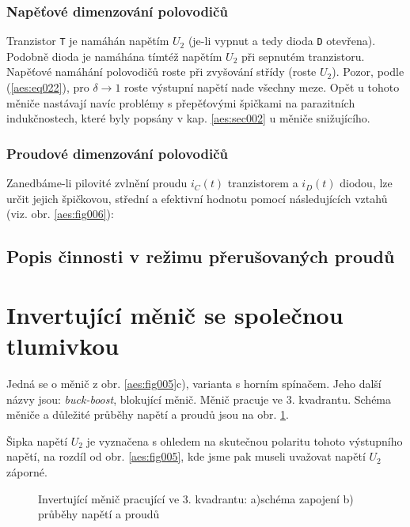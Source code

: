       \subsubsection{Napěťové dimenzování polovodičů}
        Tranzistor \texttt{T} je namáhán napětím \(U_2\) (je-li vypnut a tedy dioda \texttt{D} 
        otevřena). Podobně dioda je namáhána tímtéž napětím \(U_2\) při sepnutém tranzistoru. 
        Napěťové namáhání polovodičů roste při zvyšování střídy (roste \(U_2\)). Pozor, podle 
        (\ref{aes:eq022}), pro \(\delta\rightarrow1\) roste výstupní napětí nade všechny meze.
        Opět u tohoto měniče nastávají navíc problémy s přepěťovými špičkami na parazitních 
        indukčnostech, které byly popsány v kap. \ref{aes:sec002} u měniče snižujícího.
        
      \subsubsection{Proudové dimenzování polovodičů}
        Zanedbáme-li pilovité zvlnění proudu \(i_C(t)\) tranzistorem a \(i_D(t)\) diodou, lze určit 
        jejich špičkovou, střední a efektivní hodnotu pomocí následujících vztahů (viz. obr. 
        \ref{aes:fig006}):

    \subsection{Popis činnosti v režimu přerušovaných proudů}

  \section{Invertující měnič se společnou tlumivkou}\label{aes:sec003}  
    Jedná se o měnič z obr. \ref{aes:fig005}c), varianta s horním spínačem. Jeho další názvy jsou: 
    \emph{buck-boost}, blokující měnič. Měnič pracuje ve 3. kvadrantu. Schéma měniče a důležité 
    průběhy napětí a proudů jsou na obr. \ref{enz:fig_007}.
    
    Šipka napětí \(U_2\) je vyznačena s ohledem na skutečnou polaritu tohoto výstupního napětí, na 
    rozdíl od obr. \ref{aes:fig005}, kde jsme pak museli uvažovat napětí \(U_2\) záporné.
    
    \begin{figure}[ht!]
      \centering
      \caption{Invertující měnič pracující ve 3. kvadrantu: a)schéma zapojení b) průběhy napětí a 
               proudů}
      \label{enz:fig_007}
    \end{figure}
    
